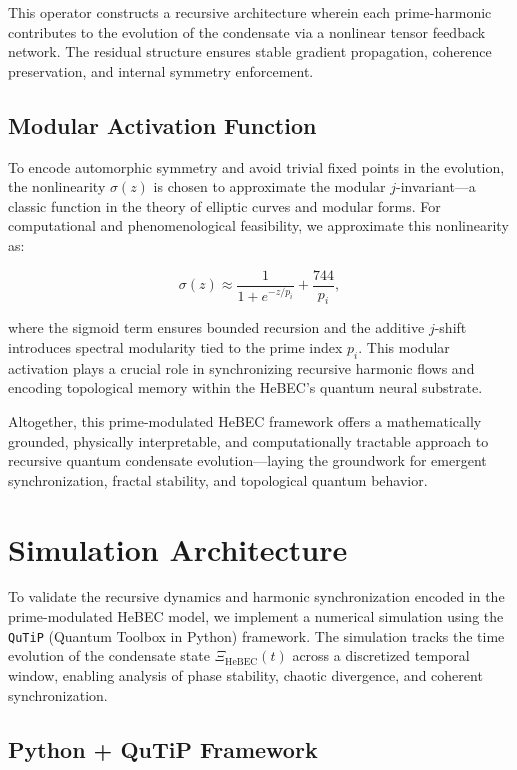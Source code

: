 \documentclass{article}
\theoremstyle{plain}
\begin{document}
This operator constructs a recursive architecture wherein each prime-harmonic contributes to the evolution of the condensate via a nonlinear tensor feedback network. The residual structure ensures stable gradient propagation, coherence preservation, and internal symmetry enforcement.

\subsection{Modular Activation Function}

To encode automorphic symmetry and avoid trivial fixed points in the evolution, the nonlinearity \( \sigma(z) \) is chosen to approximate the modular \( j \)-invariant—a classic function in the theory of elliptic curves and modular forms. For computational and phenomenological feasibility, we approximate this nonlinearity as:

\begin{equation}
\sigma(z) \approx \frac{1}{1 + e^{-z/p_i}} + \frac{744}{p_i},
\end{equation}

where the sigmoid term ensures bounded recursion and the additive \( j \)-shift introduces spectral modularity tied to the prime index \( p_i \). This modular activation plays a crucial role in synchronizing recursive harmonic flows and encoding topological memory within the HeBEC's quantum neural substrate.

\vspace{0.5em}
Altogether, this prime-modulated HeBEC framework offers a mathematically grounded, physically interpretable, and computationally tractable approach to recursive quantum condensate evolution—laying the groundwork for emergent synchronization, fractal stability, and topological quantum behavior.


\section{Simulation Architecture}

To validate the recursive dynamics and harmonic synchronization encoded in the prime-modulated HeBEC model, we implement a numerical simulation using the \texttt{QuTiP} (Quantum Toolbox in Python) framework. The simulation tracks the time evolution of the condensate state \( \Xi_{\text{HeBEC}}(t) \) across a discretized temporal window, enabling analysis of phase stability, chaotic divergence, and coherent synchronization.

\subsection{Python + QuTiP Framework}
\end{document}
